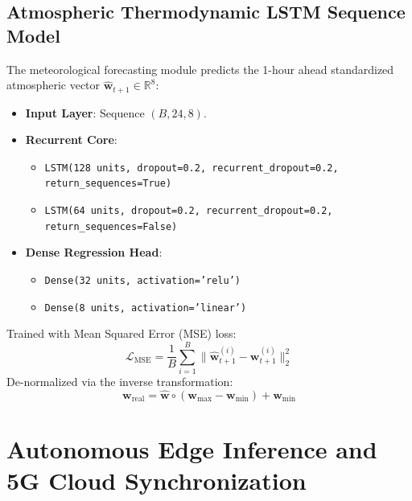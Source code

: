 \documentclass[12pt,a4paper,oneside]{report}
\begin{document}
\section{Atmospheric Thermodynamic LSTM Sequence Model}
The meteorological forecasting module predicts the 1-hour ahead standardized atmospheric vector $\hat{\mathbf{w}}_{t+1} \in \mathbb{R}^8$:
\begin{itemize}
    \item \textbf{Input Layer}: Sequence $(B, 24, 8)$.
    \item \textbf{Recurrent Core}:
    \begin{itemize}
        \item \texttt{LSTM(128 units, dropout=0.2, recurrent\_dropout=0.2, return\_sequences=True)}
        \item \texttt{LSTM(64 units, dropout=0.2, recurrent\_dropout=0.2, return\_sequences=False)}
    \end{itemize}
    \item \textbf{Dense Regression Head}:
    \begin{itemize}
        \item \texttt{Dense(32 units, activation='relu')}
        \item \texttt{Dense(8 units, activation='linear')}
    \end{itemize}
\end{itemize}
Trained with Mean Squared Error (MSE) loss:
\begin{equation}
\mathcal{L}_{\text{MSE}} = \frac{1}{B}\sum_{i=1}^{B} \|\hat{\mathbf{w}}_{t+1}^{(i)} - \mathbf{w}_{t+1}^{(i)}\|_2^2
\end{equation}
De-normalized via the inverse transformation:
\begin{equation}
\mathbf{w}_{\text{real}} = \hat{\mathbf{w}} \circ (\mathbf{w}_{\max} - \mathbf{w}_{\min}) + \mathbf{w}_{\min}
\end{equation}

\chapter{Autonomous Edge Inference and 5G Cloud Synchronization}
\label{chap:edge_cloud}
\end{document}

